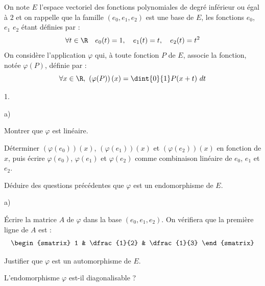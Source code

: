 \noindent
On note $E$ l'espace vectoriel des fonctions polynomiales de degré
inférieur ou égal à $2$ et on rappelle que la famille
$(e_{0},e_{1},e_{2})$ est une base de $E$, les fonctions $e_{0}$,
$e_{1}$ $e_{2}$ étant définies par :
\[
\forall t \in \R \quad e_{0}(t) = 1, \quad e_{1}(t) = t, \quad
e_{2}(t) = t^{2}
\]
On considère l'application $\varphi$ qui, à toute fonction $P$ de $E$,
associe la fonction, notée $\varphi(P)$, définie par :
\[
\forall x \in \R, \ \left(\varphi(P)\right)(x) = \dint{0}{1} P(x + t)
\ dt
\]
\begin{noliste}{1.}
 \setlength{\itemsep}{4mm}
\item
  \begin{noliste}{a)}
    \setlength{\itemsep}{2mm}
  \item Montrer que $\varphi$ est linéaire.

    
    
  \item Déterminer $\left(\varphi(e_{0})\right)(x)$,
    $\left(\varphi(e_{1})\right)(x)$ et
    $\left(\varphi(e_{2})\right)(x)$ en fonction de $x$, puis écrire
    $\varphi(e_{0})$, $\varphi(e_{1})$ et $\varphi(e_{2})$ comme
    combinaison linéaire de $e_{0}$, $e_{1}$ et $e_{2}$.

    

  \item Déduire des questions précédentes que $\varphi$ est un
    endomorphisme de $E$.

    
  \end{noliste}
  
  
  
  
\item
  \begin{noliste}{a)}
    \setlength{\itemsep}{2mm}
  \item Écrire la matrice $A$ de $\varphi$ dans la base
    $(e_{0},e_{1},e_{2})$. On vérifiera que la première ligne de $A$
    est :
    \[
    \begin{smatrix}
      1 & \dfrac{1}{2} & \dfrac{1}{3}
    \end{smatrix}
    \]

    

  \item Justifier que $\varphi$ est un automorphisme de $E$.

    

  \item L'endomorphisme $\varphi$ est-il diagonalisable ?

    
  \end{noliste}


\end{noliste}
